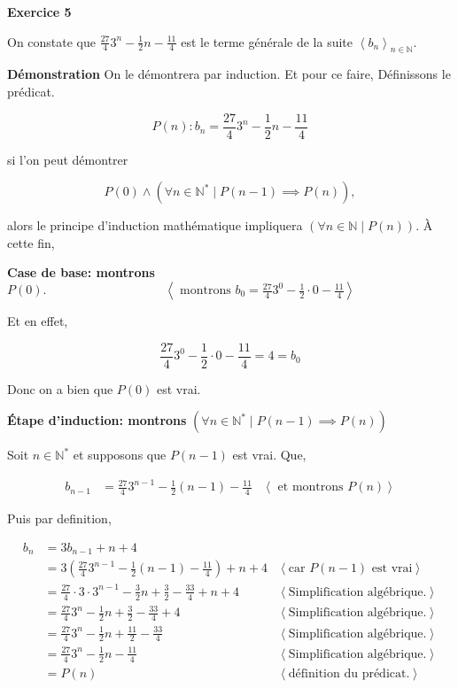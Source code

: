 \documentclass{article}
\newcommand{\tuple}[1]{\ensuremath{\left\langle #1 \right\rangle}}
\begin{document}
\textbf{Exercice 5}

\vspace{0.5cm}
On constate que $\frac{27}{4}3^n - \frac{1}{2}n - \frac{11}{4}$ est le terme générale de la suite $\tuple{b_n}_{n \in \mathbb{N}}$.

\vspace{0.5cm}

\textbf{Démonstration} On le démontrera par induction. Et pour ce faire, Définissons le prédicat.

$$P(n): b_n = \frac{27}{4}3^n - \frac{1}{2}n - \frac{11}{4} $$ 

si l'on peut démontrer 

$$P(0) \land (\forall n \in \mathbb{N}^{*} \mid P(n-1) \implies P(n)),$$

alors le principe d'induction mathématique impliquera $(\forall n \in \mathbb{N} \mid P(n))$. À cette fin,
\vspace{0.5cm}

\textbf{Case de base: montrons} $P(0). \hspace{4cm} \tuple{ \text{ montrons } b_0 = \frac{27}{4}3^0 - \frac{1}{2}\cdot 0 - \frac{11}{4}}$

Et en effet,

$$ \frac{27}{4}3^0 - \frac{1}{2}\cdot 0 - \frac{11}{4} = 4 = b_0$$

Donc on a bien que $P(0)$ est vrai.

\vspace{0.5cm}
\textbf{Étape d'induction: montrons} $(\forall n \in \mathbb{N}^{*} \mid P(n-1) \implies P(n))$

Soit $n \in \mathbb{N}^{*}$ et supposons que $P(n-1)$ est vrai. Que,

\begin{align*}
b_{n-1} &= \frac{27}{4}3^{n-1} - \frac{1}{2}(n-1) - \frac{11}{4} &\tuple{ \text{ et montrons } P(n)}
\end{align*}

Puis par definition, 

\begin{align*}
b_n &= 3b_{n-1} + n + 4 \\
&= 3\left(\frac{27}{4}3^{n-1} - \frac{1}{2}(n-1) - \frac{11}{4}\right) + n + 4 
&\tuple{ \text{car } P(n-1) \text{ est vrai}} \\
&= \frac{27}{4} \cdot 3 \cdot 3^{n-1} - \frac{3}{2}n + \frac{3}{2} - \frac{33}{4} + n + 4 
& \tuple{ \text{Simplification algébrique.}} \\
&= \frac{27}{4}3^n - \frac{1}{2}n + \frac{3}{2} - \frac{33}{4} + 4 
& \tuple{ \text{Simplification algébrique.}} \\
&= \frac{27}{4}3^n - \frac{1}{2}n + \frac{11}{2} - \frac{33}{4} 
&\tuple{ \text{Simplification algébrique.}} \\
&= \frac{27}{4}3^n - \frac{1}{2}n - \frac{11}{4} 
&\tuple{ \text{Simplification algébrique.}} \\
&= P(n) 
&\tuple{ \text{définition du prédicat.}}
\end{align*}
\end{document}
